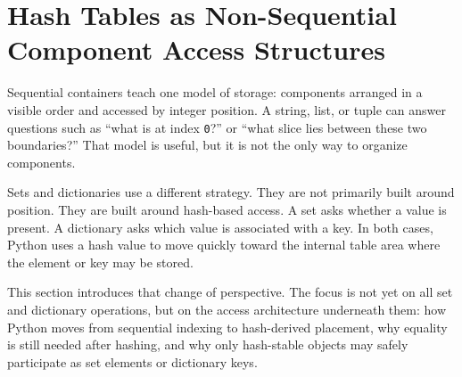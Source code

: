 \section{Hash Tables as Non-Sequential Component Access Structures}

Sequential containers teach one model of storage: components arranged in a visible order and accessed by integer position. A string, list, or tuple can answer questions such as ``what is at index \texttt{0}?'' or ``what slice lies between these two boundaries?'' That model is useful, but it is not the only way to organize components.

Sets and dictionaries use a different strategy. They are not primarily built around position. They are built around hash-based access. A set asks whether a value is present. A dictionary asks which value is associated with a key. In both cases, Python uses a hash value to move quickly toward the internal table area where the element or key may be stored.

This section introduces that change of perspective. The focus is not yet on all set and dictionary operations, but on the access architecture underneath them: how Python moves from sequential indexing to hash-derived placement, why equality is still needed after hashing, and why only hash-stable objects may safely participate as set elements or dictionary keys.